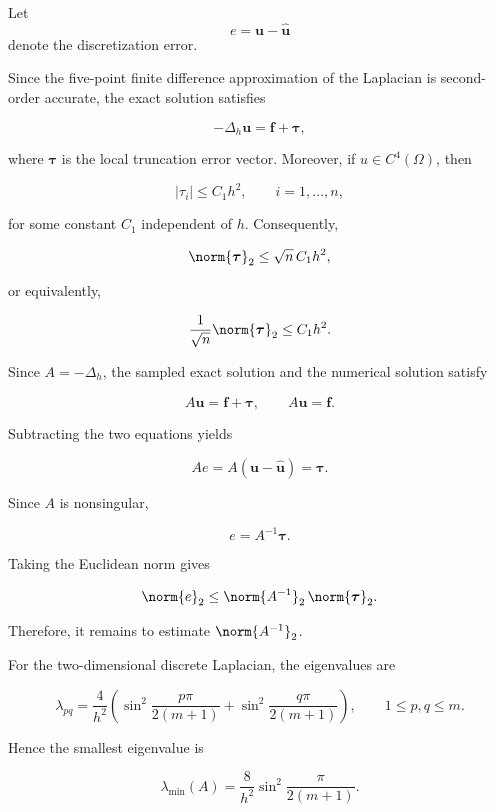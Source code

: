 \documentclass{ctexart}
\begin{document}
\begin{solution}

  Let
  \[
    e=\mathbf u-\hat{\mathbf u}
  \]
  denote the discretization error.

  Since the five-point finite difference approximation of the Laplacian
  is second-order accurate, the exact solution satisfies

  \[
    -\Delta_h \mathbf u
    =
    \mathbf f+\boldsymbol\tau,
  \]

  where \(\boldsymbol\tau\) is the local truncation error vector.
  Moreover, if \(u\in C^4(\Omega)\), then

  \[
    |\tau_i|
    \le
    C_1 h^2,
    \qquad
    i=1,\ldots,n,
  \]

  for some constant \(C_1\) independent of \(h\).
  Consequently,

  \[
    \norm{\boldsymbol\tau}_2
    \le
    \sqrt n\, C_1 h^2,
  \]

  or equivalently,

  \[
    \frac1{\sqrt n}\norm{\boldsymbol\tau}_2
    \le
    C_1 h^2.
  \]

  Since \(A=-\Delta_h\), the sampled exact solution and the numerical
  solution satisfy

  \[
    A\mathbf u
    =
    \mathbf f+\boldsymbol\tau,
    \qquad
    A\hat{\mathbf u}
    =
    \mathbf f .
  \]

  Subtracting the two equations yields

  \[
    Ae
    =
    A(\mathbf u-\hat{\mathbf u})
    =
    \boldsymbol\tau .
  \]

  Since \(A\) is nonsingular,

  \[
    e
    =
    A^{-1}\boldsymbol\tau .
  \]

  Taking the Euclidean norm gives

  \[
    \norm{e}_2
    \le
    \norm{A^{-1}}_2
    \,\norm{\boldsymbol\tau}_2 .
  \]

  Therefore, it remains to estimate \(\norm{A^{-1}}_2\).

  For the two-dimensional discrete Laplacian, the eigenvalues are

  \[
    \lambda_{pq}
    =
    \frac4{h^2}
    \left(
      \sin^2
      \frac{p\pi}{2(m+1)}
      +
      \sin^2
      \frac{q\pi}{2(m+1)}
    \right),
    \qquad
    1\le p,q\le m .
  \]

  Hence the smallest eigenvalue is

  \[
    \lambda_{\min}(A)
    =
    \frac8{h^2}
    \sin^2
    \frac{\pi}{2(m+1)} .
  \]


\end{solution}
\end{document}
